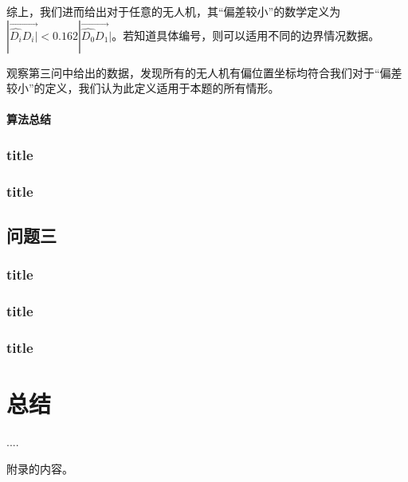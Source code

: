 \documentclass[withoutpreface,bwprint]{cumcmthesis} %
\begin{document}
			综上，我们进而给出对于任意的无人机，其“偏差较小”的数学定义为$|\overrightarrow{\widehat{D_i}D_i|}<0.162|\overrightarrow{\widehat{D_0}D_1}|$。若知道具体编号，则可以适用不同的边界情况数据。
			
			观察第三问中给出的数据，发现所有的无人机有偏位置坐标均符合我们对于“偏差较小”的定义，我们认为此定义适用于本题的所有情形。
			
			\paragraph{算法总结}
			
			\subsubsection{title}
			\subsubsection{title}
		\subsection{问题三}
			\subsubsection{title}
			\subsubsection{title}
			\subsubsection{title}
	\section{总结}
	\begin{thebibliography}{9}%
		 ....
	\end{thebibliography}
	\begin{appendices}
		附录的内容。
	\end{appendices}
\end{document}
